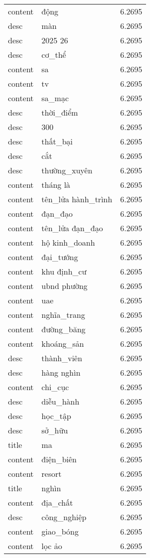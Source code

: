 \documentclass{article}
\begin{document}
\begin{tabular}{lll}
content & động & 6.2695\\
desc & màn & 6.2695\\
desc & 2025 26 & 6.2695\\
desc & cơ\_thể & 6.2695\\
content & sa & 6.2695\\
content & tv & 6.2695\\
content & sa\_mạc & 6.2695\\
desc & thời\_điểm & 6.2695\\
desc & 300 & 6.2695\\
desc & thất\_bại & 6.2695\\
desc & cắt & 6.2695\\
desc & thường\_xuyên & 6.2695\\
content & tháng là & 6.2695\\
content & tên\_lửa hành\_trình & 6.2695\\
content & đạn\_đạo & 6.2695\\
content & tên\_lửa đạn\_đạo & 6.2695\\
content & hộ kinh\_doanh & 6.2695\\
content & đại\_tướng & 6.2695\\
content & khu định\_cư & 6.2695\\
content & ubnd phường & 6.2695\\
content & uae & 6.2695\\
content & nghĩa\_trang & 6.2695\\
content & đường\_băng & 6.2695\\
content & khoáng\_sản & 6.2695\\
desc & thành\_viên & 6.2695\\
desc & hàng nghìn & 6.2695\\
content & chi\_cục & 6.2695\\
desc & diễu\_hành & 6.2695\\
desc & học\_tập & 6.2695\\
desc & sở\_hữu & 6.2695\\
title & ma & 6.2695\\
content & điện\_biên & 6.2695\\
content & resort & 6.2695\\
title & nghìn & 6.2695\\
content & địa\_chất & 6.2695\\
desc & công\_nghiệp & 6.2695\\
content & giao\_bóng & 6.2695\\
content & lọc ảo & 6.2695\\

\end{tabular}
\end{document}
